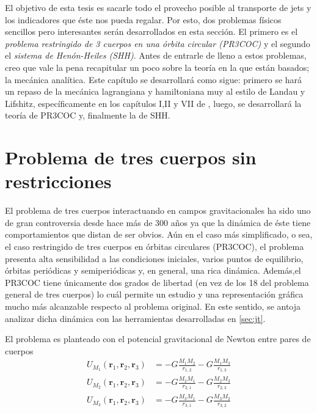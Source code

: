 
El objetivo de esta tesis es sacarle todo el provecho posible al transporte de jets y los indicadores que éste nos pueda regalar. Por esto, dos problemas físicos sencillos pero interesantes serán desarrollados en esta sección. El primero es el \textit{problema restringido de 3 cuerpos en una órbita circular (PR3COC)} y el segundo el \textit{sistema de Henón-Heiles (SHH)}. Antes de entrarle de lleno a estos problemas, creo que vale la pena recapitular un poco sobre la teoría en la que están basados; la mecánica analítica. Este capítulo se desarrollará como sigue: primero se hará un repaso de la mecánica lagrangiana y hamiltoniana muy al estilo de Landau y Lifshitz, específicamente en los capítulos I,II y VII de \cite{mechanics_landau_lifshitz}, luego, se desarrollará la teoría de PR3COC y, finalmente la de SHH.

\section{Problema de tres cuerpos sin restricciones}
\label{sec:3BP}

El problema de tres cuerpos interactuando en campos gravitacionales ha sido uno de gran controversia desde hace más de 300 años ya que la dinámica de éste tiene comportamientos que distan de ser obvios. Aún en el caso más simplificado, o sea, el caso restringido de tres cuerpos en órbitas circulares (PR3COC), el problema presenta alta sensibilidad a las condiciones iniciales, varios puntos de equilibrio, órbitas periódicas y semiperiódicas y, en general, una rica dinámica. Además,el PR3COC tiene únicamente dos grados de libertad (en vez de los 18 del problema general de tres cuerpos) lo cuál permite un estudio y una representación gráfica mucho más alcanzable respecto al problema original. En este sentido, se antoja analizar dicha dinámica con las herramientas desarrolladas en \ref{sec:jt}.

El problema es planteado con el potencial gravitacional de Newton entre pares de cuerpos 
\begin{align}
 U_{M_1}(\mathbf{r}_1,\mathbf{r}_2,\mathbf{r}_3) &= -G \frac{M_1 M_2}{r_{1,2}} - G \frac{M_1 M_3}{r_{1,3}} \\
 U_{M_2}(\mathbf{r}_1,\mathbf{r}_2,\mathbf{r}_3) &= -G \frac{M_2 M_1}{r_{2,1}} - G \frac{M_2 M_3}{r_{2,3}} \\
 U_{M_3}(\mathbf{r}_1,\mathbf{r}_2,\mathbf{r}_3) &= -G \frac{M_3 M_1}{r_{3,1}} - G \frac{M_3 M_2}{r_{3,2}}
 \label{eq:3body_potential}
\end{align}


